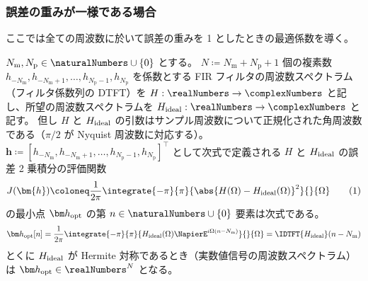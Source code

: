         \subsubsection{誤差の重みが一様である場合}
            \newcommand{\Nm}{{N_\text{m}}}
            \newcommand{\Np}{{N_\text{p}}}
            \label{誤差の重みが一様である場合}
            ここでは全ての周波数に於いて誤差の重みを 1 としたときの最適係数を導く。
            \begin{shadebox}
                $\Nm,\Np\in\naturalNumbers\cup\{0\}$ とする。
                $N\coloneq\Nm+\Np+1$ 個の複素数 $h_{-\Nm},h_{-\Nm+1},\dots,h_{\Np-1},h_\Np$ を係数とする FIR フィルタの周波数スペクトラム（フィルタ係数列の DTFT）を $H:\realNumbers\to\complexNumbers$ と記し、所望の周波数スペクトラムを $\Hideal:\realNumbers\to\complexNumbers$ と記す。
                但し $H$ と $H_\text{ideal}$ の引数はサンプル周波数について正規化された角周波数である（$\pi/2$ が Nyquist 周波数に対応する）。
                $\bm{h} \coloneq [h_{-\Nm},h_{-\Nm+1},\dots,h_{\Np-1},h_\Np]^\top$ として次式で定義される $H$ と $H_\text{ideal}$ の誤差 2 乗積分の評価関数
                \[ J(\bm{h}) \coloneq \frac{1}{2\pi}\integrate{-\pi}{\pi}{\abs{H(\Omega)-\Hideal(\Omega)}^2}{}{\Omega} \tag{1} \]
                の最小点 $\vhOpt$ の第 $n\in\naturalNumbers\cup\{0\}$ 要素は次式である。
                \[ \vhOpt[n] = \frac{1}{2\pi}\integrate{-\pi}{\pi}{\Hideal(\Omega)\NapierE^{i\Omega (n-\Nm)}}{}{\Omega} = \IDTFT{\Hideal}(n-\Nm) \]
                とくに $H_\text{ideal}$ が Hermite 対称であるとき（実数値信号の周波数スペクトラム）は $\vhOpt\in\realNumbers^N$ となる。
            \end{shadebox}
